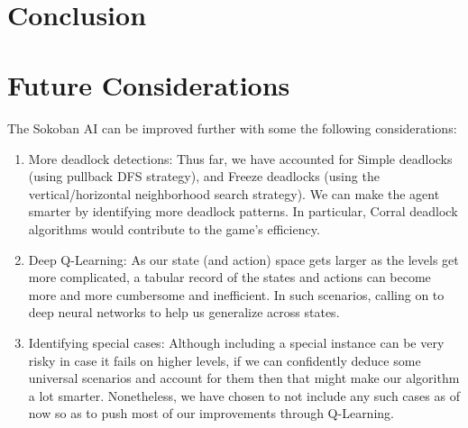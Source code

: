 \documentclass{article}
\begin{document}

\\






\section{Conclusion}

\section{Future Considerations}
The Sokoban AI can be improved further with some the following considerations:
\begin{enumerate}
    \item More deadlock detections: Thus far, we have accounted for Simple deadlocks (using pullback DFS strategy), and Freeze deadlocks (using the vertical/horizontal neighborhood search strategy). We can make the agent smarter by identifying more deadlock patterns. In particular, Corral deadlock algorithms would contribute to the game's efficiency.
    \item Deep Q-Learning: As our state (and action) space gets larger as the levels get more complicated, a tabular record of the states and actions can become more and more cumbersome and inefficient. In such scenarios, calling on to deep neural networks to help us generalize across states.
    \item Identifying special cases: Although including a special instance can be very risky in case it fails on higher levels, if we can confidently deduce some universal scenarios and account for them then that might make our algorithm a lot smarter. Nonetheless, we have chosen to not include any such cases as of now so as to push most of our improvements through Q-Learning. 
\end{enumerate}
\end{document}
